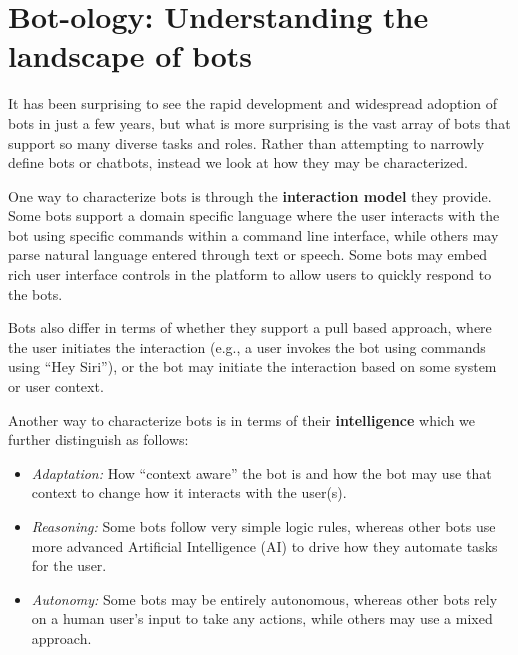 \documentclass{sig-alternate}
\newcommand{\cl}[1]{\textcolor{blue}{{\it [Carly says: #1]}}}
\begin{document}
\section{Bot-ology: Understanding the landscape of bots}


It has been surprising to see the rapid development and widespread adoption of bots in just a few years, but what is more surprising is the vast array of bots that support so many diverse tasks and roles.  
Rather than attempting to narrowly define bots or chatbots, instead we look at how they may be characterized. 

One way to characterize bots is through the \textbf{interaction model} they provide. 
Some bots support a domain specific language where the user interacts with the bot using specific commands within a command line interface, while others may parse natural language entered through text or speech.  
Some bots may embed rich user interface controls in the platform to allow users to quickly respond to the bots.

Bots also differ in terms of whether they support a pull based approach, where the user initiates the interaction (e.g., a user invokes the bot using commands using ``Hey Siri''), or the bot may initiate the interaction based on some system or user context. 

Another way to characterize bots is in terms of their \textbf{intelligence} which we further distinguish as follows:
\begin{itemize}
\item \emph{Adaptation:} How ``context aware'' the bot is and how the bot may use that context to change how it interacts with the user(s). 
\item \emph{Reasoning:} Some bots follow very simple logic rules,
whereas other bots use more advanced Artificial Intelligence (AI) to drive how they automate tasks for the user.  
\item \emph{Autonomy:}  Some bots may be entirely autonomous, whereas other bots rely on a human user's input to take any actions, while others may use a mixed approach.  
\end{itemize}
\end{document}
